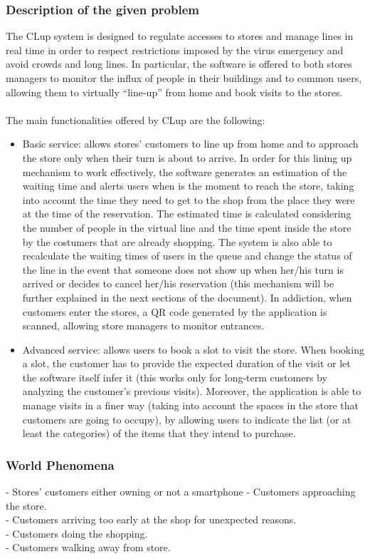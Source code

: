 \documentclass{article}
\begin{document}
\subsubsection{Description of the given problem}
The CLup system is designed to regulate accesses to stores and manage lines in real time in order to respect restrictions imposed by the virus emergency and avoid crowds and long lines. In particular, the software is offered to both stores managers to monitor the influx of people in their buildings and to common users, allowing them to virtually “line-up” from home and book visits to the stores.\\
\smallskip\\
The main functionalities offered by CLup are the following:\\
\begin{itemize}
\item Basic service: allows stores' customers to line up from home and to approach the store only when their turn is about to arrive. In order for this lining up mechanism to work effectively, the software generates an estimation of the waiting time and alerts users when is the moment to reach the store, taking into account the time they need to get to the shop from the place they were at the time of the reservation. The estimated time is calculated considering the number of people in the virtual line and the time spent inside the store by the costumers that are already shopping. The system is also able to recalculate the waiting times of users in the queue and change the status of the line in the event that someone does not show up when her/his turn is arrived or decides to cancel her/his reservation (this mechanism will be further explained in the next sections of the document). In addiction, when customers enter the stores, a QR code generated by the application is scanned, allowing store managers to monitor entrances.
\item Advanced service: allows users to book a slot to visit the store. When booking a slot, the customer has to provide the expected duration of the visit or let the software itself infer it (this works only for long-term customers by analyzing the customer’s previous visits). Moreover, the application is able to manage visits in a finer way (taking into account the spaces in the store that customers are going to occupy), by allowing users to indicate the list (or at least the categories) of the items that they intend to purchase.
\end{itemize}
\subsubsection{World Phenomena}
\noindent\medskip
[WP1] - Stores’ customers either owning or not a smartphone
\noindent\medskip
[WP2] - Customers approaching the store.\\
\noindent\medskip
[WP3] - Customers arriving too early at the shop for unexpected reasons.\\
\noindent\medskip
[WP4] - Customers doing the shopping.\\
\noindent\medskip
[WP5] - Customers walking away from store.
\end{document}

